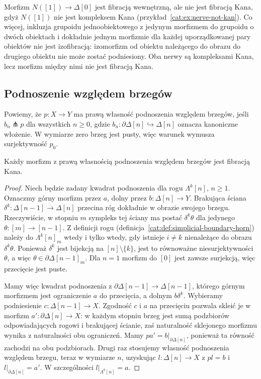 \begin{przyklad}\label{cat:ex:inner-not-kan-fibration}
Morfizm $N([1])\to\Delta[0]$ jest fibracją wewnętrzną, ale nie jest fibracją Kana, gdyż $N([1])$ nie jest kompleksem Kana (przykład~\ref{cat:ex:nerve-not-kan}). Co więcej, inkluzja grupoidu jednoobiektowego z jedynym morfizmem do grupoidu o dwóch obiektach i dokładnie jednym morfizmie dla każdej uporządkowanej pary obiektów nie jest izofibracją: izomorfizm od obiektu należącego do obrazu do drugiego obiektu nie może zostać podniesiony. Oba nerwy są kompleksami Kana, lecz morfizm między nimi nie jest fibracją Kana.
\end{przyklad}

\subsection{Podnoszenie względem brzegów}

\begin{definicja}\label{cat:def:boundary-injective}
Powiemy, że $p:X\to Y$ ma prawą własność podnoszenia względem brzegów, jeśli $b_n\pitchfork p$ dla wszystkich $n\geq0$, gdzie $b_n:\partial\Delta[n]\hookrightarrow\Delta[n]$ oznacza kanoniczne włożenie. W wymiarze zero brzeg jest pusty, więc warunek wymusza surjektywność $p_0$.
\end{definicja}

\begin{stwierdzenie}\label{cat:prop:boundary-lifting-kan}
Każdy morfizm z prawą własnością podnoszenia względem brzegów jest fibracją Kana.
\end{stwierdzenie}
\begin{proof}
Niech będzie zadany kwadrat podnoszenia dla rogu $\Lambda^k[n]$, $n\geq1$. Oznaczmy górny morfizm przez $a$, dolny przez $b:\Delta[n]\to Y$. Brakująca ściana $\delta^k:\Delta[n-1]\to\Delta[n]$ przecina róg dokładnie w obrazie swojego brzegu. Rzeczywiście, w stopniu $m$ sympleks tej ściany ma postać $\delta^k\theta$ dla jedynego $\theta:[m]\to[n-1]$. Z definicji rogu (definicja~\ref{cat:def:simplicial-boundary-horn}) należy do $\Lambda^k[n]_m$ wtedy i tylko wtedy, gdy istnieje $i\ne k$ nienależące do obrazu $\delta^k\theta$. Ponieważ $\delta^k$ jest bijekcją na $[n]\setminus\{k\}$, jest to równoważne niesurjektywności $\theta$, a więc $\theta\in\partial\Delta[n-1]_m$. Dla $n=1$ morfizm do $[0]$ jest zawsze surjekcją, więc przecięcie jest puste.

Mamy więc kwadrat podnoszenia z $\partial\Delta[n-1]\to\Delta[n-1]$, którego górnym morfizmem jest ograniczenie $a$ do przecięcia, a dolnym $b\delta^k$. Wybieramy podniesienie $c:\Delta[n-1]\to X$. Zgodność $c$ i $a$ na przecięciu pozwala skleić je w morfizm $a':\partial\Delta[n]\to X$: w każdym stopniu brzeg jest sumą podzbiorów odpowiadających rogowi i brakującej ścianie, zaś naturalność sklejonego morfizmu wynika z naturalności obu ograniczeń. Mamy $pa'=b|_{\partial\Delta[n]}$, ponieważ ta równość zachodzi na obu podzbiorach. Drugi raz stosujemy własność podnoszenia względem brzegu, teraz w wymiarze $n$, uzyskując $l:\Delta[n]\to X$ z $pl=b$ i $l|_{\partial\Delta[n]}=a'$. W szczególności $l|_{\Lambda^k[n]}=a$.
\end{proof}



